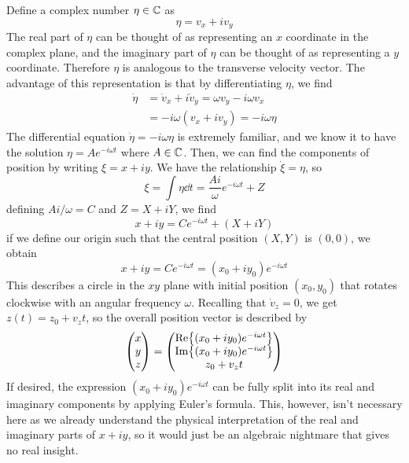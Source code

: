 Define a complex number $\eta\in\mathbb{C}$ as
\[ \eta = v_x + iv_y \]
The real part of $\eta$ can be thought of as representing an $x$ coordinate in the complex plane, and the imaginary part of $\eta$ can be thought of as representing a $y$ coordinate. Therefore $\eta$ is analogous to the transverse velocity vector. The advantage of this representation is that by differentiating $\eta$, we find
\begin{align*}
    \dot \eta &= \dot v_x + i \dot v_y = \omega v_y - i \omega v_x \\
    &= -i\omega(v_x + iv_y) = -i\omega\eta 
\end{align*}
The differential equation $\dot\eta = -i\omega\eta$ is extremely familiar, and we know it to have the solution $\eta = Ae^{-i\omega t}$ where $A\in\mathbb{C}$. Then, we can find the components of position by writing $\xi = x + iy$. We have the relationship $\dot\xi = \eta$, so
\[ \xi = \int \eta \dd t = \frac{Ai}{\omega}e^{-i\omega t} + Z\]
defining $Ai/\omega = C$ and $Z = X+iY$, we find
\[ x + iy = Ce^{-i\omega t} + (X + iY) \]
if we define our origin such that the central position $(X,Y)$ is $(0,0)$, we obtain
\[ x + iy = Ce^{-i\omega t} = (x_0 + iy_0)e^{-i\omega t} \]
This describes a circle in the $xy$ plane with initial position $(x_0, y_0)$ that rotates clockwise with an angular frequency $\omega$. Recalling that $\dot v_z = 0$, we get $z(t) = z_0 + v_zt$, so the overall position vector is described by
\[ \begin{pmatrix}x\\y\\z\end{pmatrix} = \begin{pmatrix}\Re{(x_0+iy_0)e^{-i\omega t}} \\ \Im{(x_0+iy_0)e^{-i\omega t}} \\ z_0 + v_zt\end{pmatrix}\]
If desired, the expression $(x_0+iy_0)e^{-i\omega t}$ can be fully split into its real and imaginary components by applying Euler's formula. This, however, isn't necessary here as we already understand the physical interpretation of the real and imaginary parts of $x+iy$, so it would just be an algebraic nightmare that gives no real insight. 